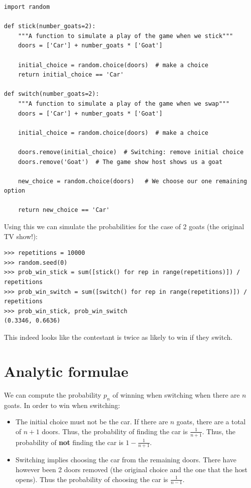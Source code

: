 \documentclass[a4paper]{article}
\begin{document}
\begin{verbatim}
import random

def stick(number_goats=2):
    """A function to simulate a play of the game when we stick"""
    doors = ['Car'] + number_goats * ['Goat']
        
    initial_choice = random.choice(doors)  # make a choice
    return initial_choice == 'Car'

def switch(number_goats=2):
    """A function to simulate a play of the game when we swap"""
    doors = ['Car'] + number_goats * ['Goat']  
    
    initial_choice = random.choice(doors)  # make a choice
    
    doors.remove(initial_choice)  # Switching: remove initial choice
    doors.remove('Goat')  # The game show host shows us a goat
    
    new_choice = random.choice(doors)   # We choose our one remaining option
            
    return new_choice == 'Car'
\end{verbatim}

Using this we can simulate the probabilities for the case of 2 goats (the
original TV show!):

\begin{verbatim}
>>> repetitions = 10000
>>> random.seed(0)
>>> prob_win_stick = sum([stick() for rep in range(repetitions)]) / repetitions
>>> prob_win_switch = sum([switch() for rep in range(repetitions)]) / repetitions
>>> prob_win_stick, prob_win_switch
(0.3346, 0.6636)
\end{verbatim}

This indeed looks like the contestant is twice as likely to win if they switch.

\section{Analytic formulae}\label{sec:analytical_formulae}

We can compute the probability \(p_n\) of winning when switching when there are
\(n\) goats. In order to win when switching:

\begin{itemize}
    \item The initial choice must not be the car. If there are \(n\) goats,
        there are a total of \(n + 1\) doors. Thus, the probability of finding
        the car is \(\frac{1}{n + 1}\). Thus, the probability of \textbf{not}
        finding the car is \(1 - \frac{1}{n + 1}\).
    \item Switching implies choosing the car from the remaining doors. There
        have however been 2 doors removed (the original choice and the one that
        the host opens). Thus the probability of choosing the car is
        \(\frac{1}{n - 1}\).
\end{itemize}
\end{document}
